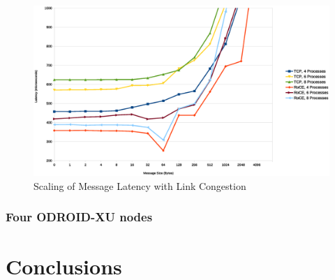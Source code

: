 \documentclass[a4paper]{article}
\begin{document}
\begin{figure}[H]
\includegraphics[width=\textwidth]{pingpong_multi_zoom}
\caption{Scaling of Message Latency with Link Congestion}
\label{multipingpong}
\end{figure}

\subsubsection{\textbf{Four ODROID-XU nodes}}

\newpage
\section{\textbf{Conclusions}}
\label{conclusions}



\end{document}
